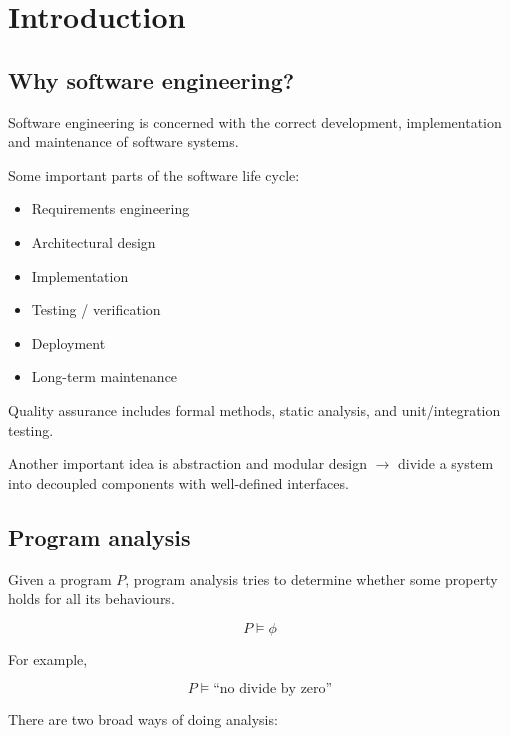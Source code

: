 \documentclass[11pt]{book}
\begin{document}
\chapter{Introduction}

\section{Why software engineering?}

Software engineering is concerned with the correct development,
implementation and maintenance of software systems.

Some important parts of the software life cycle:

\begin{itemize}
    \item Requirements engineering
    \item Architectural design
    \item Implementation
    \item Testing / verification
    \item Deployment
    \item Long-term maintenance
\end{itemize}

Quality assurance includes formal methods, static analysis,
and unit/integration testing.

Another important idea is abstraction and modular design
$\rightarrow$ divide a system into decoupled components
with well-defined interfaces.

\section{Program analysis}

Given a program $P$, program analysis tries to determine
whether some property holds for all its behaviours.

\[
P \models \phi
\]

For example,

\[
P \models \text{``no divide by zero''}
\]

There are two broad ways of doing analysis:
\end{document}
